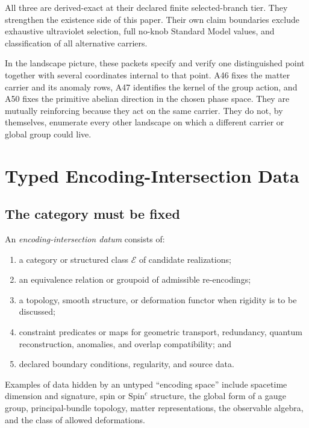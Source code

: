 \documentclass[11pt]{article}
\newcommand{\Enc}{\mathcal E}
\begin{document}
All three are derived-exact at their declared finite selected-branch tier.
They strengthen the existence side of this paper.  Their own claim boundaries
exclude exhaustive ultraviolet selection, full no-knob Standard Model values,
and classification of all alternative carriers.

In the landscape picture, these packets specify and verify one distinguished
point together with several coordinates internal to that point.  A46 fixes the
matter carrier and its anomaly rows, A47 identifies the kernel of the group
action, and A50 fixes the primitive abelian direction in the chosen phase
space.  They are mutually reinforcing because they act on the same carrier.
They do not, by themselves, enumerate every other landscape on which a
different carrier or global group could live.

\section{Typed Encoding-Intersection Data}

\subsection{The category must be fixed}

\begin{definition}\label{def:intersection-datum}
An \emph{encoding-intersection datum} consists of:
\begin{enumerate}
\item a category or structured class $\Enc$ of candidate realizations;
\item an equivalence relation or groupoid of admissible re-encodings;
\item a topology, smooth structure, or deformation functor when rigidity is
to be discussed;
\item constraint predicates or maps for geometric transport, redundancy,
quantum reconstruction, anomalies, and overlap compatibility; and
\item declared boundary conditions, regularity, and source data.
\end{enumerate}
\end{definition}

Examples of data hidden by an untyped ``encoding space'' include spacetime
dimension and signature, spin or $\mathrm{Spin}^c$ structure, the global form
of a gauge group, principal-bundle topology, matter representations, the
observable algebra, and the class of allowed deformations.
\end{document}
